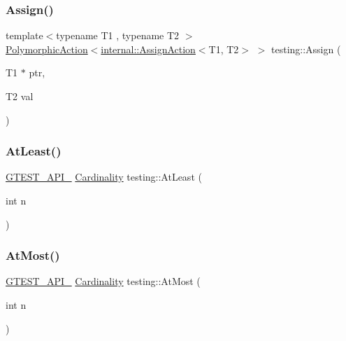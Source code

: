 \mbox{\label{namespacetesting_abfc4121b8708e8b22a096ff8be88a9d0}} 
\subsubsection{\texorpdfstring{Assign()}{Assign()}}
{\footnotesize\ttfamily template$<$typename T1 , typename T2 $>$ \\
\hyperlink{classtesting_1_1_polymorphic_action}{Polymorphic\+Action}$<$\hyperlink{classtesting_1_1internal_1_1_assign_action}{internal\+::\+Assign\+Action}$<$T1, T2$>$ $>$ testing\+::\+Assign (\begin{DoxyParamCaption}\item[{T1 $\ast$}]{ptr,  }\item[{T2}]{val }\end{DoxyParamCaption})}

\mbox{\label{namespacetesting_a137297cb3c582843989fbd937cf0fed2}} 
\subsubsection{\texorpdfstring{At\+Least()}{AtLeast()}}
{\footnotesize\ttfamily \hyperlink{gtest-port_8h_aa73be6f0ba4a7456180a94904ce17790}{G\+T\+E\+S\+T\+\_\+\+A\+P\+I\+\_\+} \hyperlink{classtesting_1_1_cardinality}{Cardinality} testing\+::\+At\+Least (\begin{DoxyParamCaption}\item[{int}]{n }\end{DoxyParamCaption})}

\mbox{\label{namespacetesting_a5487cd1068c78821ced96fbf542a91bb}} 
\subsubsection{\texorpdfstring{At\+Most()}{AtMost()}}
{\footnotesize\ttfamily \hyperlink{gtest-port_8h_aa73be6f0ba4a7456180a94904ce17790}{G\+T\+E\+S\+T\+\_\+\+A\+P\+I\+\_\+} \hyperlink{classtesting_1_1_cardinality}{Cardinality} testing\+::\+At\+Most (\begin{DoxyParamCaption}\item[{int}]{n }\end{DoxyParamCaption})}

